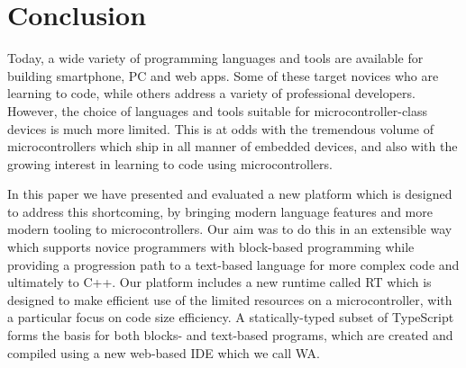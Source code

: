 \section{Conclusion}
\label{sec:conclude}


Today, a wide variety of programming languages and tools are available for building smartphone, PC and web apps. Some of these target novices who are learning to code, while others address a variety of professional developers. However, the choice of languages and tools suitable for microcontroller-class devices is much more limited. This is at odds with the tremendous volume of microcontrollers which ship in all manner of embedded devices, and also with the growing interest in learning to code using microcontrollers. 

In this paper we have presented and evaluated a new platform which is designed to address this shortcoming, by bringing modern language features and more modern tooling to microcontrollers. Our aim was to do this in an extensible way which supports novice programmers with block-based programming while providing a progression path to a text-based language for more complex code and ultimately to C++. Our platform includes a new runtime called RT which is designed to make efficient use of the limited resources on a microcontroller, with a particular focus on code size efficiency. A statically-typed subset of TypeScript forms the basis for both blocks- and text-based programs, which are created and compiled using a new web-based IDE which we call WA.

